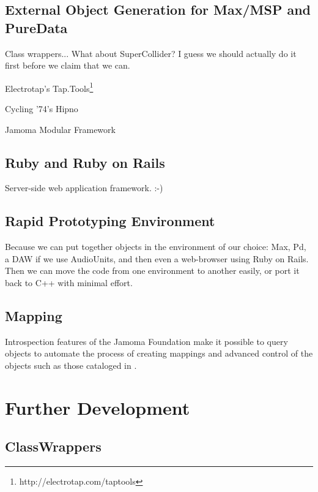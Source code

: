 \documentclass[twoside,10pt]{article}
\begin{document}


\subsection{External Object Generation for Max/MSP and PureData}

Class wrappers...  What about SuperCollider?  I guess we should actually do it first before we claim that we can.

Electrotap's Tap.Tools\footnote{http://electrotap.com/taptools}

Cycling '74's Hipno\cite{Place:2005}

Jamoma Modular Framework\cite{Place:2006}


\subsection{Ruby and Ruby on Rails}

Server-side web application framework.  :-)

\subsection{Rapid Prototyping Environment}

Because we can put together objects in the environment of our choice: Max, Pd, a DAW if we use AudioUnits, and then even a web-browser using Ruby on Rails.  Then we can move the code from one environment to another easily, or port it back to C++ with minimal effort.

\subsection{Mapping}

Introspection features of the Jamoma Foundation make it possible to query objects to automate the process of creating mappings and advanced control of the objects such as those cataloged in \cite{Pendharkar:2006}.  




\section{Further Development} %


\subsection{ClassWrappers}
\end{document}
